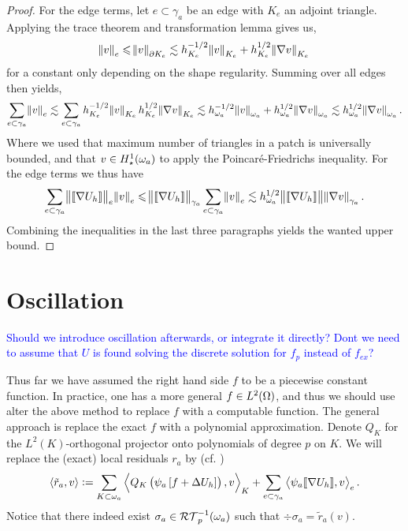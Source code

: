 \documentclass[thesis.tex]{subfiles}
\begin{document}
\begin{proof}
  For the edge terms, let $e \subset \gamma_a$ be an edge with $K_e$ an adjoint triangle. Applying the trace theorem and transformation lemma
  gives us,
  \[ 
    \norm{v}_e \leqslant \norm{v}_{\partial K_e} \lesssim h_{K_e}^{-1/2} \norm{v}_{K_e} + h_{K_e}^{1/2} \norm{\nabla v}_{K_e}
  \]
  for a constant only depending on the shape regularity. 
  Summing over all edges then yields,
  \[
    \sum_{e \subset \gamma_a} \norm{v}_e \lesssim \sum_{e\subset \gamma_a}h_{K_e}^{-1/2} \norm{v}_{K_e} h_{K_e}^{1/2} \norm{\nabla v}_{K_e}
    \lesssim h_{\omega_a}^{-1/2} \norm{v}_{\omega_a} + h_{\omega_a}^{1/2} \norm{\nabla v}_{\omega_a} \lesssim h_{\omega_a}^{1/2} \norm{\nabla v}_{\omega_a}.
  \]
  Where we used that maximum number of triangles in a patch is universally bounded, and that $v \in H_\star^1(\omega_a)$ to apply the
  Poincar\'e-Friedrichs inequality. For the edge terms we thus have
  \[
    \sum_{e \subset \gamma_a} \norm{ \llbracket \nabla U_h \rrbracket}_e \norm{v}_e \leqslant \norm{\llbracket \nabla U_h \rrbracket}_{\gamma_a} \sum_{e \subset \gamma_a} \norm{v}_e \lesssim h_{\omega_a}^{1/2} \norm{\llbracket \nabla U_h \rrbracket}  \norm{\nabla v}_{\gamma_a}. 
  \]
  Combining the inequalities in the last three paragraphs yields the wanted upper bound.
\end{proof}
\section{Oscillation}
\textcolor{blue}{Should we introduce oscillation afterwards, or integrate it directly?
Dont we need to assume that $U$ is found solving the discrete solution for $f_{p}$ instead of $f_{ex}$?}

Thus far we have assumed the right hand side $f$ to be a piecewise constant function. In practice, one 
has a more general $f \in L^2(\Omega)$, and thus we should use alter the above method to replace $f$ with a computable function.
The general approach is replace the exact $f$ with a polynomial approximation. 
Denote $Q_K$ for the $L^2(K)$-orthogonal projector onto polynomials of degree $p$ on $K$. We will replace the (exact) local residuals $r_a$ by  (cf. \cite[Thm~3.17]{ernequil})
\[
  \left \langle \tilde r_a, v \right \rangle := \sum_{K \subset \omega_a} \left \langle Q_K \left(\psi_a \left[f + \Delta U_h\right]\right), v \right \rangle_K 
  +\sum_{e \subset \gamma_a} \left \langle \psi_a \llbracket \nabla U_h\rrbracket, v \right \rangle_e.
\]
Notice that there indeed exist $\sigma_a \in \mathcal{RT}_p^{-1}(\omega_a)$ such that $\div \sigma_a = \tilde r_a(v)$.
\end{document}
